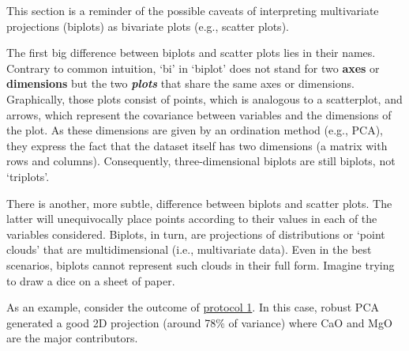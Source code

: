 \documentclass[12pt,]{book}
\begin{document}
This section is a reminder of the possible caveats of interpreting multivariate projections (biplots) as bivariate plots (e.g., scatter plots).

The first big difference between biplots and scatter plots lies in their names. Contrary to common intuition, `bi' in `biplot' does not stand for two \textbf{axes} or \textbf{dimensions} but the two \emph{\textbf{plots}} that share the same axes or dimensions. Graphically, those plots consist of points, which is analogous to a scatterplot, and arrows, which represent the covariance between variables and the dimensions of the plot. As these dimensions are given by an ordination method (e.g., PCA), they express the fact that the dataset itself has two dimensions (a matrix with rows and columns). Consequently, three-dimensional biplots are still biplots, not `triplots'.

There is another, more subtle, difference between biplots and scatter plots. The latter will unequivocally place points according to their values in each of the variables considered. Biplots, in turn, are projections of distributions or `point clouds' that are multidimensional (i.e., multivariate data). Even in the best scenarios, biplots cannot represent such clouds in their full form. Imagine trying to draw a dice on a sheet of paper.

As an example, consider the outcome of \protect\hyperlink{prot1}{protocol 1}. In this case, robust PCA generated a good 2D projection (around 78\% of variance) where CaO and MgO are the major contributors.
\end{document}
